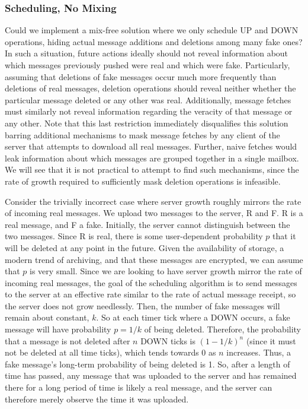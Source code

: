 \documentclass[pageno]{jpaper}
\begin{document}
\subsubsection{Scheduling, No Mixing}
Could we implement a mix-free solution where we only schedule UP and DOWN operations, hiding actual message additions and deletions among many fake ones? In such a situation, future actions ideally should not reveal information about which messages previously pushed were real and which were fake. Particularly, assuming that deletions of fake messages occur much more frequently than deletions of real messages, deletion operations should reveal neither whether the particular message deleted or any other was real. Additionally, message fetches must similarly not reveal information regarding the veracity of that message or any other. Note that this last restriction immediately disqualifies this solution barring additional mechanisms to mask message fetches by any client of the server that attempts to download all real messages. Further, naive fetches would leak information about which messages are grouped together in a single mailbox. We will see that it is not practical to attempt to find such mechanisms, since the rate of growth required to sufficiently mask deletion operations is infeasible.

Consider the trivially incorrect case where server growth roughly mirrors the rate of incoming real messages. We upload two messages to the server, R and F. R is a real message, and F a fake. Initially, the server cannot distinguish between the two messages. Since R is real, there is some user-dependent probability $p$ that it will be deleted at any point in the future. Given the availability of storage, a modern trend of archiving, and that these messages are encrypted, we can assume that $p$ is very small. Since we are looking to have server growth mirror the rate of incoming real messages, the goal of the scheduling algorithm is to send messages to the server at an effective rate similar to the rate of actual message receipt, so the server does not grow needlessly. Then, the number of fake messages will remain about constant, $k$. So at each timer tick where a DOWN occurs, a fake message will have probability $p=1/k$ of being deleted. Therefore, the probability that a message is not deleted after $n$ DOWN ticks is $(1-1/k)^n$ (since it must not be deleted at all time ticks), which tends towards 0 as $n$ increases. Thus, a fake message's long-term probability of being deleted is 1. So, after a length of time has passed, any message that was uploaded to the server and has remained there for a long period of time is likely a real message, and the server can therefore merely observe the time it was uploaded.
\end{document}
